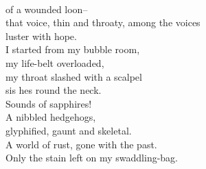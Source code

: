 \documentclass[smalldemyvopaper,11pt,twoside,onecolumn,openright,extrafontsizes]{memoir}
\begin{document}
\\of a wounded loon--
\\that voice, thin and throaty, among the voices
\\luster with hope.
\\I started from my bubble room,
\\my life-belt overloaded,
\\my throat slashed with a scalpel
\\sis hes round the neck.
\\Sounds of sapphires!
\\A nibbled hedgehogs,
\\glyphified, gaunt and skeletal.
\\A world of rust, gone with the past.
\\Only the stain left on my swaddling-bag.
\end{document}
